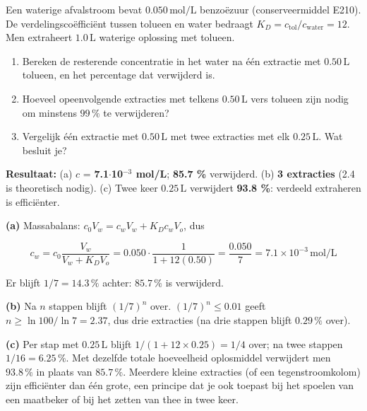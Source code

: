 \begin{oefening}
Een waterige afvalstroom bevat \(0.050\,\mathrm{mol/L}\) benzoëzuur (conserveermiddel E210). De verdelingscoëfficiënt tussen tolueen en water bedraagt \(K_D = c_{\text{tol}}/c_{\text{water}} = 12\). Men extraheert \(1.0\,\mathrm{L}\) waterige oplossing met tolueen.

\begin{enumerate}
\item[(a)]
  Bereken de resterende concentratie in het water na één extractie met \(0.50\,\mathrm{L}\) tolueen, en het percentage dat verwijderd is.
\item[(b)]
  Hoeveel opeenvolgende extracties met telkens \(0.50\,\mathrm{L}\) vers tolueen zijn nodig om minstens \(99\,\%\) te verwijderen?
\item[(c)]
  Vergelijk één extractie met \(0.50\,\mathrm{L}\) met twee extracties met elk \(0.25\,\mathrm{L}\). Wat besluit je?
\end{enumerate}
\end{oefening}
\begin{oplossing}
\textbf{Resultaat:} (a) \(c\) = \textbf{7.1\ensuremath{\cdot{}}10\ensuremath{^{-3}} mol/L}; \textbf{85.7 \%} verwijderd. (b) \textbf{3 extracties} (2.4 is theoretisch nodig). (c) Twee keer \(0.25\,\mathrm{L}\) verwijdert \textbf{93.8 \%}: verdeeld extraheren is efficiënter.

\textbf{(a)} Massabalans: \(c_0 V_w = c_w V_w + K_D c_w V_o\), dus

\[
c_w = c_0\frac{V_w}{V_w + K_D V_o} = 0.050 \cdot \frac{1}{1 + 12(0.50)} = \frac{0.050}{7} = 7.1\times10^{-3}\,\mathrm{mol/L}
\]

Er blijft \(1/7 = 14.3\,\%\) achter: \(85.7\,\%\) is verwijderd.

\textbf{(b)} Na \(n\) stappen blijft \((1/7)^n\) over. \((1/7)^n \leq 0.01\) geeft \(n \geq \ln 100/\ln 7 = 2.37\), dus drie extracties (na drie stappen blijft \(0.29\,\%\) over).

\textbf{(c)} Per stap met \(0.25\,\mathrm{L}\) blijft \(1/(1 + 12 \times 0.25) = 1/4\) over; na twee stappen \(1/16 = 6.25\,\%\). Met dezelfde totale hoeveelheid oplosmiddel verwijdert men \(93.8\,\%\) in plaats van \(85.7\,\%\). Meerdere kleine extracties (of een tegenstroomkolom) zijn efficiënter dan één grote, een principe dat je ook toepast bij het spoelen van een maatbeker of bij het zetten van thee in twee keer.
\end{oplossing}


